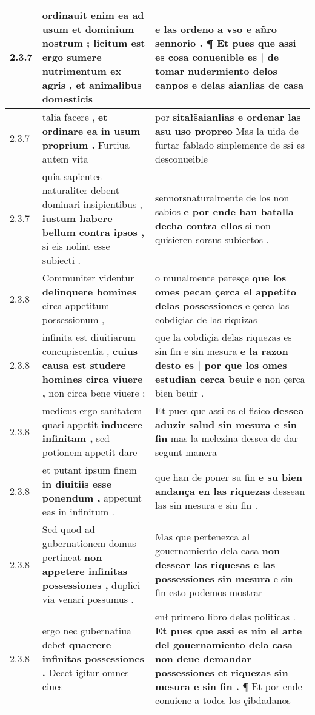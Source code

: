 \begin{tabular}{|p{1cm}|p{6.5cm}|p{6.5cm}|}
2.3.7 & ordinauit enim ea ad usum et dominium nostrum ; \textbf{ licitum est ergo sumere nutrimentum ex agris , } et animalibus domesticis & e las ordeno a vso e añro sennorio . \textbf{ ¶ Et pues que assi es cosa conuenible es | de tomar nudermiento delos canpos } e delas aianlias de casa \\\hline
2.3.7 & talia facere , \textbf{ et ordinare ea in usum proprium . } Furtiua autem vita & por \textbf{ sitałs̃aianlias e ordenar las asu uso propreo } Mas la uida de furtar fablado sinplemente de ssi es desconueible \\\hline
2.3.7 & quia sapientes naturaliter debent dominari insipientibus , \textbf{ iustum habere bellum contra ipsos , } si eis nolint esse subiecti . & sennorsnaturalmente de los non sabios \textbf{ e por ende han batalla decha contra ellos } si non quisieren sorsus subiectos . \\\hline
2.3.8 & Communiter videntur \textbf{ delinquere homines } circa appetitum possessionum , & o munalmente paresçe \textbf{ que los omes pecan çerca el appetito delas possessiones } e çerca las cobdiçias de las riquizas \\\hline
2.3.8 & infinita est diuitiarum concupiscentia , \textbf{ cuius causa est studere homines circa viuere , } non circa bene viuere ; & que la cobdiçia delas riquezas es sin fin e sin mesura \textbf{ e la razon desto es | por que los omes estudian cerca beuir } e non çerca bien beuir . \\\hline
2.3.8 & medicus ergo sanitatem quasi appetit \textbf{ inducere infinitam , } sed potionem appetit dare & Et pues que assi es el fisico \textbf{ dessea aduzir salud sin mesura e sin fin } mas la melezina dessea de dar segunt manera \\\hline
2.3.8 & et putant ipsum finem \textbf{ in diuitiis esse ponendum , } appetunt eas in infinitum . & que han de poner su fin \textbf{ e su bien andança en las riquezas } dessean las sin mesura e sin fin . \\\hline
2.3.8 & Sed quod ad gubernationem domus pertineat \textbf{ non appetere infinitas possessiones , } duplici via venari possumus . & Mas que pertenezca al gouernamiento dela casa \textbf{ non dessear las riquesas e las possessiones sin mesura } e sin fin esto podemos mostrar \\\hline
2.3.8 & ergo nec gubernatiua debet \textbf{ quaerere infinitas possessiones . } Decet igitur omnes ciues & enł primero libro delas politicas . \textbf{ Et pues que assi es nin el arte del gouernamiento dela casa non deue demandar possessiones et riquezas sin mesura e sin fin . } ¶ Et por ende conuiene a todos los çibdadanos \\\hline

\end{tabular}
